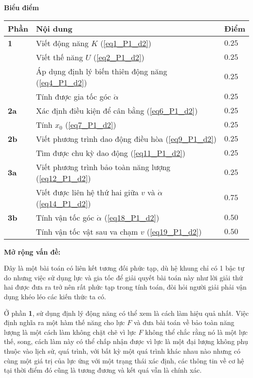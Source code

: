 \textbf{Biểu điểm}
\begin{center}
\begin{tabular}{|>{\centering\arraybackslash}m{1cm}|>{\raggedright\arraybackslash}m{14cm}| >{\centering\arraybackslash}m{1cm}|}
    \hline
\textbf{Phần} & \textbf{Nội dung} & \textbf{Điểm} \\
    \hline
    \textbf{1} & Viết động năng $K$ (\ref{eq1_P1_d2}) & $0.25$ \\
    \cline{2-3}
    & Viết thế năng $U$ (\ref{eq2_P1_d2}) & $0.25$ \\
    \cline{2-3}
    & Áp dụng định lý biến thiên động năng (\ref{eq4_P1_d2}) & $0.25$ \\
    \cline{2-3} 
    & Tính được gia tốc góc $\ddot{\alpha}$ & $0.25$ \\
    \hline
    \textbf{2a} & Xác định điều kiện để cân bằng (\ref{eq6_P1_d2}) & $0.25$ \\
    \cline{2-3}
    & Tính $x_0$ (\ref{eq7_P1_d2}) & $0.25$ \\
    \hline
    \textbf{2b} & Viết phương trình dao động điều hòa (\ref{eq9_P1_d2}) & $0.25$ \\
    \cline{2-3}
    & Tìm được chu kỳ dao động (\ref{eq11_P1_d2}) & $0.25$ \\
    \hline
    \textbf{3a} & Viết phương trình bảo toàn năng lượng (\ref{eq12_P1_d2}) & $0.25$ \\
    \cline{2-3}
    & Viết được liên hệ thứ hai giữa $v$ và $\dot{\alpha}$ (\ref{eq14_P1_d2}) & $0.75$ \\ 
    \hline
    \textbf{3b} & Tính vận tốc góc $\dot{\alpha}$ (\ref{eq18_P1_d2}) & $0.50$ \\
    \cline{2-3} 
    & Tính vận tốc vật sau va chạm $v$ (\ref{eq19_P1_d2}) & $0.50$ \\
    \hline
\end{tabular}
\end{center}

\noindent \textbf{Mở rộng vấn đề:}

\indent Đây là một bài toán có liên kết tương đối phức tạp, dù hệ khung chỉ có 1 bậc tự do nhưng việc sử dụng lực và gia tốc để giải quyết bài toán này như lời giải thứ hai được đưa ra trở nên rất phức tạp trong tính toán, đòi hỏi người giải phải vận dụng khéo léo các kiến thức ta có.

\indent Ở phần \textbf{1}, sử dụng định lý động năng có thể xem là cách làm hiệu quả nhất. Việc định nghĩa ra một hàm thế năng cho lực $F$ và đưa bài toán về bảo toàn năng lượng là một cách làm không chặt chẽ vì lực $F$ không thể chắc rằng nó là một lực thế, song, cách làm này có thể chấp nhận được vì lực là một đại lượng không phụ thuộc vào lịch sử, quá trình, với bất kỳ một quá trình khác nhau nào nhưng có cùng một giá trị của lực ứng với một trạng thái xác định, các thông tin về cơ hệ tại thời điểm đó cũng là tương đương và kết quá vẫn là chính xác.

